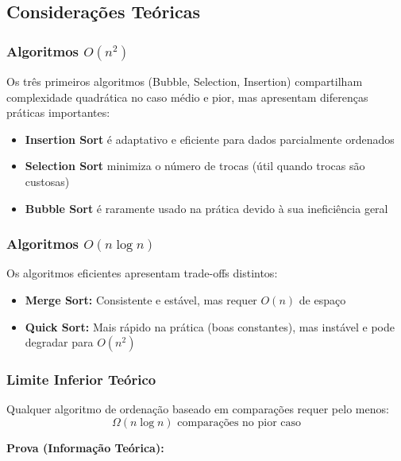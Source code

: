\documentclass[conference]{IEEEtran}
\begin{document}
\subsection{Considerações Teóricas}

\subsubsection{Algoritmos $O(n^2)$}

Os três primeiros algoritmos (Bubble, Selection, Insertion) compartilham complexidade quadrática no caso médio e pior, mas apresentam diferenças práticas importantes:

\begin{itemize}
    \item \textbf{Insertion Sort} é adaptativo e eficiente para dados parcialmente ordenados
    \item \textbf{Selection Sort} minimiza o número de trocas (útil quando trocas são custosas)
    \item \textbf{Bubble Sort} é raramente usado na prática devido à sua ineficiência geral
\end{itemize}

\subsubsection{Algoritmos $O(n \log n)$}

Os algoritmos eficientes apresentam trade-offs distintos:

\begin{itemize}
    \item \textbf{Merge Sort:} Consistente e estável, mas requer $O(n)$ de espaço
    \item \textbf{Quick Sort:} Mais rápido na prática (boas constantes), mas instável e pode degradar para $O(n^2)$
\end{itemize}

\subsubsection{Limite Inferior Teórico}

Qualquer algoritmo de ordenação baseado em comparações requer pelo menos:
\begin{equation}
\Omega(n \log n) \text{ comparações no pior caso}
\end{equation}

\textbf{Prova (Informação Teórica):}
\end{document}
